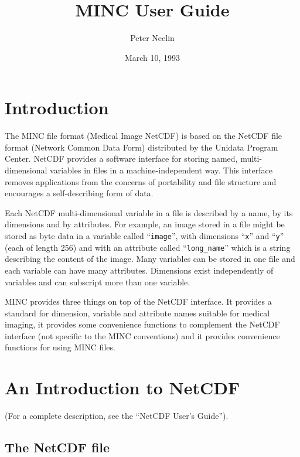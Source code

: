 \title{MINC User Guide}
\author{Peter Neelin}
\date{March 10, 1993}
\textwidth 6.0in
\oddsidemargin 0.125in
\textheight 8.5in
\topmargin -0.75in



\maketitle

\section{Introduction}

The MINC file format (Medical Image NetCDF) is based on the NetCDF
file format (Network Common Data Form) distributed by the Unidata
Program Center. NetCDF provides a software interface for storing
named, multi-dimensional variables in files in a machine-independent
way. This interface removes applications from the concerns of
portability and file structure and encourages a self-describing form
of data.

Each NetCDF multi-dimensional variable in a file is described by a
name, by its dimensions and by attributes. For example, an image
stored in a file might be stored as byte data in a variable called
``\verb+image+'', with dimensions ``\verb+x+'' and ``\verb+y+'' (each
of length 256) and with an attribute called ``\verb+long_name+'' which
is a string describing the content of the image. Many variables can be
stored in one file and each variable can have many attributes.
Dimensions exist independently of variables and can subscript more
than one variable.

MINC provides three things on top of the NetCDF interface. It provides
a standard for dimension, variable and attribute names suitable for
medical imaging, it provides some convenience functions to complement
the NetCDF interface (not specific to the MINC conventions) and it
provides convenience functions for using MINC files.

\section{An Introduction to NetCDF}

(For a complete description, see the ``NetCDF User's Guide'').

\subsection{The NetCDF file}

